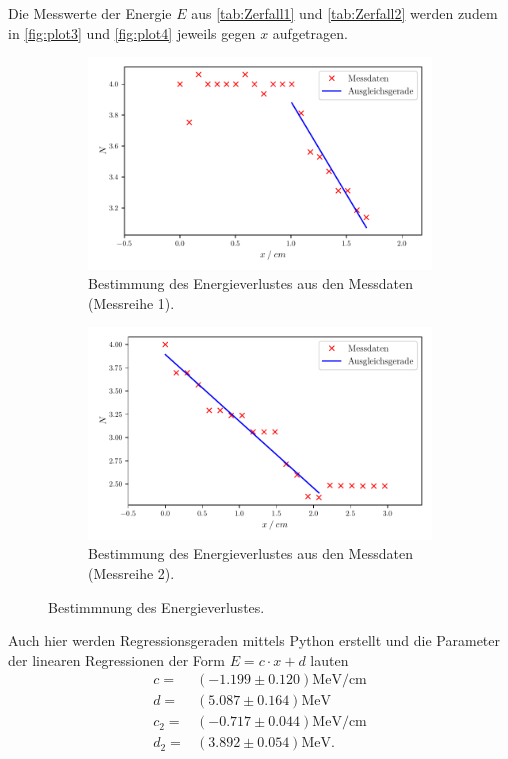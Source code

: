Die Messwerte der Energie $E$ aus \autoref{tab:Zerfall1} und \autoref{tab:Zerfall2} werden zudem in \autoref{fig:plot3} und \autoref{fig:plot4}
jeweils gegen $x$ aufgetragen.

\begin{figure}[H]
  \begin{subfigure}{\textwidth}
  \centering
  \includegraphics[scale=0.75]{build/plot3.pdf}
  \caption {Bestimmung des Energieverlustes aus den Messdaten (Messreihe 1).}
  \label{fig:plot3}
\end{subfigure}
\hfill
\begin{subfigure}{\textwidth}
  \centering
  \includegraphics[scale=0.75]{build/plot4.pdf}
  \caption {Bestimmung des Energieverlustes aus den Messdaten (Messreihe 2).}
  \label{fig:plot4}
\end{subfigure}
\caption{Bestimmnung des Energieverlustes.}
\end{figure}

Auch hier werden Regressionsgeraden mittels Python erstellt und die Parameter der linearen Regressionen der Form
$E=c \cdot x +d $ lauten
\begin{align*}
  c =& (-1.199 \pm  0.120)\si{\mega\eV\per\centi\meter}\\
  d =& (5.087 \pm 0.164) \si{\mega\eV}\\
  c_2 =& (-0.717 \pm  0.044)\si{\mega\eV\per\centi\meter}\\
  d_2 =& (3.892 \pm 0.054) \si{\mega\eV}.
\end{align*}

